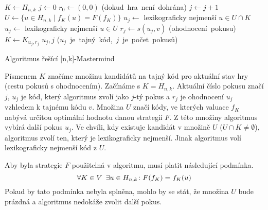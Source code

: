 
\begin{algorithm}[h!]
\begin{algorithmic}[1]  %
    \State $K \gets H_{n,k}$ 
    \State $j \gets 0$
    \State $r_0 \gets (0,0)$
     \hfill \mbox{(dokud hra není dohrána)}
        \State $j \gets j + 1$ 
	\State $U \gets \{u \in H_{n,k} \mid f_K(u) = F(f_K)\}$
            \State $u_j \gets$ lexikograficky nejmenší $u \in U \cap K$
	\Else
		\State $u_j \gets$ lexikograficky nejmenší $u \in U$
	\EndIf
        \State $r_j \gets s(u_j, v)$ \hfill \mbox{(ohodnocení pokusu)}
        \State $K \gets K_{u_j,r_j}$
    \EndWhile
    \State \Return $u_j, j$ \hfill \mbox{($u_j$ je tajný kód, $j$ je počet pokusů)}
\EndFunction
\end{algorithmic}
\caption{Algoritmus řešící [n,k]-Mastermind}
\label{alg-default}
\end{algorithm}

Písmenem $K$ značíme množinu kandidátů na tajný kód pro aktuální stav hry (cestu pokusů s ohodnocením). Začínáme s $K = H_{n,k}$. Aktuální číslo pokusu značí $j$, $u_j$ je kód, který algoritmus zvolí jako $j$-tý pokus a $r_j$ je ohodnocení $u_j$ vzhledem k tajnému kódu $v$. Množina $U$ značí kódy, ve kterých valuace $f_K$ nabývá určitou optimální hodnotu danou strategií $F$. Z této množiny algoritmus vybírá další pokus $u_j$. Ve chvíli, kdy existuje kandidát v množině $U$ ($U\cap K \neq \emptyset$), algoritmus zvolí ten, který je lexikograficky nejmenší. Jinak algoritmus volí lexikograficky nejmenší kód z $U$. 

Aby byla strategie $F$ použitelná v algoritmu, musí platit následující podmínka. 
\[\forall K \in V \hspace{5px} \exists u \in H_{n,k} \colon F(f_K) = f_K(u)\]
Pokud by tato podmínka nebyla splněna, mohlo by se stát, že množina $U$ bude prázdná a algoritmus nedokáže zvolit další pokus.


